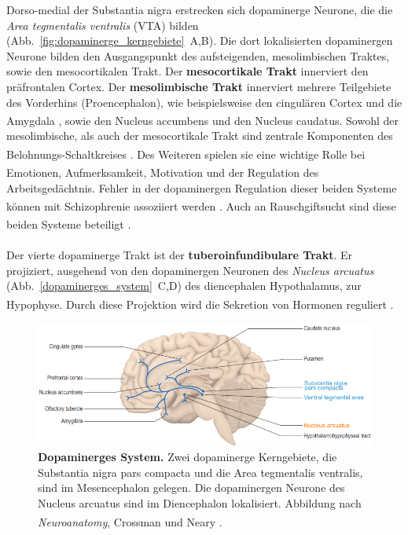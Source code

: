 \documentclass[12pt,a4paper,pdftex]{article}
\begin{document}
Dorso-medial der Substantia nigra erstrecken sich dopaminerge Neurone, die die \textit{Area tegmentalis ventralis} (VTA) bilden (Abb.~\ref{fig:dopaminerge_kerngebiete}~A,B). Die dort lokalisierten dopaminergen Neurone bilden den Ausgangspunkt des aufsteigenden, mesolimbischen Traktes, sowie den mesocortikalen Trakt. Der \textbf{mesocortikale Trakt} innerviert den präfrontalen Cortex. Der \textbf{mesolimbische Trakt} innerviert mehrere Teilgebiete des Vorderhins (Proencephalon), wie beispielsweise den cingulären Cortex und die Amygdala \textsuperscript{\cite[9]{crossman2014neuroanatomy}}, sowie den Nucleus accumbens und den Nucleus caudatus.
Sowohl der mesolimbische, als auch der mesocortikale Trakt sind zentrale Komponenten des Belohnungs-Schaltkreises \textsuperscript{\cite[49]{kandel2013principles}}.
Des Weiteren spielen sie eine wichtige Rolle bei Emotionen, Aufmerksamkeit, Motivation \textsuperscript{\cite[13]{kandel2013principles}} und der Regulation des Arbeitsgedächtnis. Fehler in der dopaminergen Regulation dieser beiden Systeme können mit Schizophrenie assoziiert werden \textsuperscript{\cite[67]{kandel2013principles}}.
Auch an Rauschgiftsucht sind diese beiden Systeme beteiligt \textsuperscript{\cite[13]{kandel2013principles}}.
\\
\\
Der vierte dopaminerge Trakt ist der \textbf{tuberoinfundibulare Trakt}. Er projiziert, ausgehend von den dopaminergen Neuronen des \textit{Nucleus arcuatus} (Abb.~\ref{dopaminerges_system}~C,D) des diencephalen Hypothalamus, zur Hypophyse. Durch diese Projektion wird die Sekretion von Hormonen reguliert \textsuperscript{\cite[13]{kandel2013principles}}.

\begin{figure}[H]
    \centering
    \includegraphics[width=\textwidth]{pictures/Bilder_monoamine_systeme/dopaminerges_system.PNG}
    \caption[Dopaminerges System]{\textbf{Dopaminerges System.} Zwei dopaminerge Kerngebiete, die Substantia nigra pars compacta und die Area tegmentalis ventralis, sind im Mesencephalon gelegen. Die dopaminergen Neurone des Nucleus arcuatus sind im Diencephalon lokalisiert. Abbildung nach \textit{Neuroanatomy}, Crossman und Neary
    \textsuperscript{\cite[9]{crossman2014neuroanatomy}}.}
    \label{fig:dopaminerges_system}
\end{figure}
\end{document}
